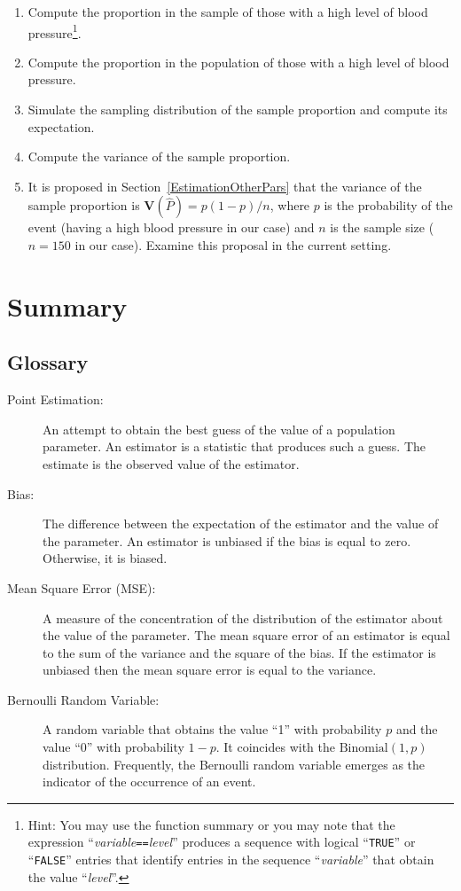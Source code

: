\documentclass[
]{krantz}
\newcommand{\Var}{\mathbf{V}}
\theoremstyle{definition}
\theoremstyle{definition}
\theoremstyle{definition}
\theoremstyle{remark}
\begin{document}
\begin{enumerate}
\def\labelenumi{\arabic{enumi}.}
\item
  Compute the proportion in the sample of those with a high level of
  blood pressure\footnote{Hint: You may use the function summary or you may note that the
    expression ``\emph{variable}\texttt{==}\emph{level}'' produces a sequence with logical
    ``\texttt{TRUE}'' or ``\texttt{FALSE}'' entries that identify entries in the sequence
    ``\emph{variable}'' that obtain the value ``\emph{level}''.}.
\item
  Compute the proportion in the population of those with a high level
  of blood pressure.
\item
  Simulate the sampling distribution of the sample proportion and
  compute its expectation.
\item
  Compute the variance of the sample proportion.
\item
  It is proposed in Section~\ref{EstimationOtherPars} that the variance
  of the sample proportion is \(\Var(\hat P) = p(1-p)/n\), where \(p\) is
  the probability of the event (having a high blood pressure in our
  case) and \(n\) is the sample size (\(n=150\) in our case). Examine this
  proposal in the current setting.
\end{enumerate}

\hypertarget{summary-8}{%
\section{Summary}\label{summary-8}}

\hypertarget{glossary}{%
\subsection*{Glossary}\label{glossary}}


\begin{description}
\item[Point Estimation:]
An attempt to obtain the best guess of the value of a population
parameter. An estimator is a statistic that produces such a guess.
The estimate is the observed value of the estimator.
\item[Bias:]
The difference between the expectation of the estimator and the
value of the parameter. An estimator is unbiased if the bias is
equal to zero. Otherwise, it is biased.
\item[Mean Square Error (MSE):]
A measure of the concentration of the distribution of the estimator
about the value of the parameter. The mean square error of an
estimator is equal to the sum of the variance and the square of the
bias. If the estimator is unbiased then the mean square error is
equal to the variance.
\item[Bernoulli Random Variable:]
A random variable that obtains the value ``1'' with probability \(p\)
and the value ``0'' with probability \(1-p\). It coincides with the
\(\mathrm{Binomial}(1,p)\) distribution. Frequently, the Bernoulli
random variable emerges as the indicator of the occurrence of an
event.
\end{description}
\end{document}
